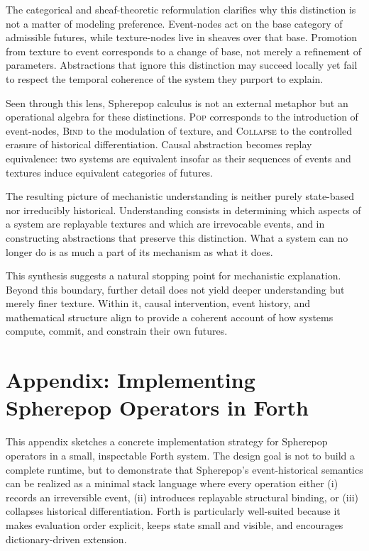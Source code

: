 \documentclass[11pt]{article}
\begin{document}
The categorical and sheaf-theoretic reformulation clarifies why this distinction
is not a matter of modeling preference. Event-nodes act on the base category of
admissible futures, while texture-nodes live in sheaves over that base. Promotion
from texture to event corresponds to a change of base, not merely a refinement
of parameters. Abstractions that ignore this distinction may succeed locally yet
fail to respect the temporal coherence of the system they purport to explain.

Seen through this lens, Spherepop calculus is not an external metaphor but an
operational algebra for these distinctions. \textsc{Pop} corresponds to the
introduction of event-nodes, \textsc{Bind} to the modulation of texture, and
\textsc{Collapse} to the controlled erasure of historical differentiation. Causal
abstraction becomes replay equivalence: two systems are equivalent insofar as
their sequences of events and textures induce equivalent categories of futures.

The resulting picture of mechanistic understanding is neither purely
state-based nor irreducibly historical. Understanding consists in determining
which aspects of a system are replayable textures and which are irrevocable
events, and in constructing abstractions that preserve this distinction. What a
system can no longer do is as much a part of its mechanism as what it does.

This synthesis suggests a natural stopping point for mechanistic explanation.
Beyond this boundary, further detail does not yield deeper understanding but
merely finer texture. Within it, causal intervention, event history, and
mathematical structure align to provide a coherent account of how systems
compute, commit, and constrain their own futures.

\appendix
\section{Appendix: Implementing Spherepop Operators in Forth}

This appendix sketches a concrete implementation strategy for Spherepop
operators in a small, inspectable Forth system. The design goal is not to build
a complete runtime, but to demonstrate that Spherepop’s event-historical
semantics can be realized as a minimal stack language where every operation
either (i) records an irreversible event, (ii) introduces replayable structural
binding, or (iii) collapses historical differentiation. Forth is particularly
well-suited because it makes evaluation order explicit, keeps state small and
visible, and encourages dictionary-driven extension.
\end{document}
